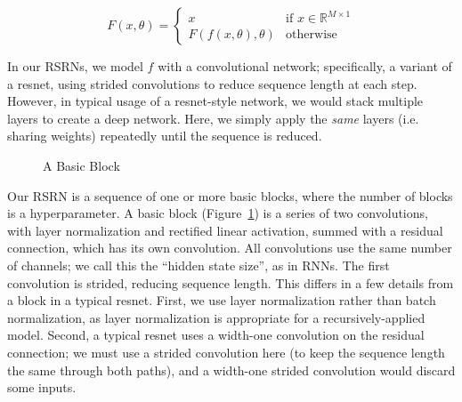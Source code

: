 \documentclass{article}
\newcommand{\real}{\mathbb{R}}
\begin{document}
\begin{equation}
    F(x, \theta) =
    \begin{cases}
        x &\text{if } x \in \real^{M \times 1} \\
        F(f(x, \theta), \theta) &\text{otherwise}
    \end{cases}
\end{equation}

In our RSRNs, we model $f$ with a convolutional network; specifically, a variant of a resnet, using strided convolutions to reduce sequence length at each step.
However, in typical usage of a resnet-style network, we would stack multiple layers to create a deep network.
Here, we simply apply the \emph{same} layers (i.e. sharing weights) repeatedly until the sequence is reduced.

\begin{figure}
\centering
{}
\caption{A Basic Block}
\label{fig:block}
\end{figure}

Our RSRN is a sequence of one or more basic blocks, where the number of blocks is a hyperparameter.
A basic block (Figure~\ref{fig:block}) is a series of two convolutions, with layer normalization and rectified linear activation, summed with a residual connection, which has its own convolution.
All convolutions use the same number of channels; we call this the ``hidden state size'', as in RNNs.
The first convolution is strided, reducing sequence length.
This differs in a few details from a block in a typical resnet.
First, we use layer normalization rather than batch normalization, as layer normalization is appropriate for a recursively-applied model.
Second, a typical resnet uses a width-one convolution on the residual connection; we must use a strided convolution here (to keep the sequence length the same through both paths), and a width-one strided convolution would discard some inputs.
\end{document}
